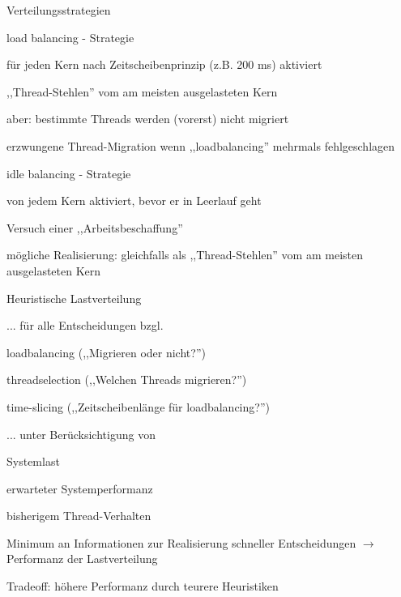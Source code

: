 \documentclass[a4paper]{article}
\begin{document}
\begin{multicols}{3}
    Verteilungsstrategien
    \begin{description*}
        \item[load balancing] - Strategie
        \begin{itemize*}
            \item für jeden Kern nach Zeitscheibenprinzip (z.B. 200 ms) aktiviert
            \item ,,Thread-Stehlen'' vom am meisten ausgelasteten Kern
            \item aber: bestimmte Threads werden (vorerst) nicht migriert
            \item erzwungene Thread-Migration wenn ,,loadbalancing'' mehrmals fehlgeschlagen
        \end{itemize*}
        \item[idle balancing] - Strategie
        \begin{itemize*}
            \item von jedem Kern aktiviert, bevor er in Leerlauf geht
            \item Versuch einer ,,Arbeitsbeschaffung''
            \item mögliche Realisierung: gleichfalls als ,,Thread-Stehlen'' vom am meisten ausgelasteten Kern
        \end{itemize*}
    \end{description*}

    Heuristische Lastverteilung
    \begin{itemize*}
        \item ... für alle Entscheidungen bzgl.
        \begin{itemize*}
            \item loadbalancing (,,Migrieren oder nicht?'')
            \item threadselection (,,Welchen Threads migrieren?'')
            \item time-slicing (,,Zeitscheibenlänge für loadbalancing?'')
        \end{itemize*}
        \item ... unter Berücksichtigung von
        \begin{itemize*}
            \item Systemlast
            \item erwarteter Systemperformanz
            \item bisherigem Thread-Verhalten
        \end{itemize*}
        \item Minimum an Informationen zur Realisierung schneller Entscheidungen $\rightarrow$ Performanz der Lastverteilung
        \item Tradeoff: höhere Performanz durch teurere Heuristiken %
    \end{itemize*}


\end{multicols}
\end{document}
